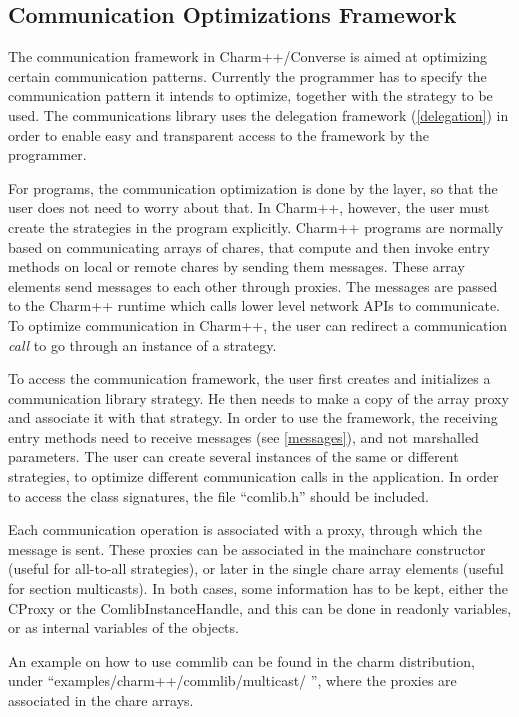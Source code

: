 \subsection{Communication Optimizations Framework}

The communication framework in Charm++/Converse is aimed at optimizing certain
communication patterns. Currently the programmer has to specify the
communication pattern it intends to optimize, together with the strategy to be
used. The communications library uses the delegation framework
(\ref{delegation}) in order to enable easy and transparent access to the
framework by the programmer.

For \ampi{} programs, the communication optimization is done by the \ampi{}
layer, so that the user does not need to worry about that. In Charm++, however,
the user must create the strategies in the program explicitly. Charm++ programs
are normally based on communicating arrays of chares, that compute and then
invoke entry methods on local or remote chares by sending them messages. These
array elements send messages to each other through proxies. The messages are
passed to the Charm++ runtime which calls lower level network APIs to
communicate. To optimize communication in Charm++, the user can redirect a
communication {\em call} to go through an instance of a strategy.

To access the communication framework, the user first creates and initializes a
communication library strategy. He then needs to make a copy of the array proxy
and associate it with that strategy. In order to use the framework, the
receiving entry methods need to receive messages (see \ref{messages}), and not
marshalled parameters. The user can create several instances of the same or
different strategies, to optimize different communication calls in the
application. In order to access the class signatures, the file ``comlib.h''
should be included.

Each communication operation is associated with a proxy, through which the
message is sent. These proxies can be associated in the mainchare constructor
(useful for all-to-all strategies), or later in the single chare
array elements (useful for section multicasts). In both cases, some
information has to be kept, either the CProxy or the ComlibInstanceHandle, and
this can be done in readonly variables, or as internal variables of the objects.

An example on how to use commlib can be found in the charm distribution, under
``examples/charm++/commlib/multicast/ '', where the proxies are associated in the
chare arrays.


